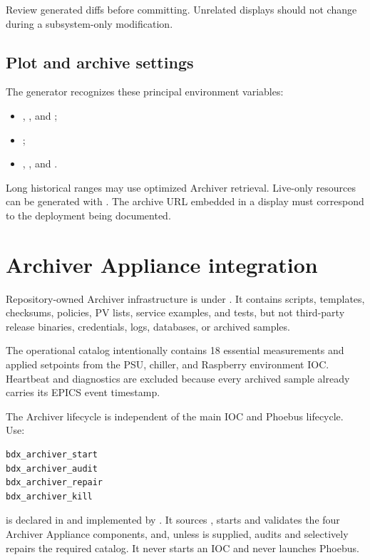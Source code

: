Review generated diffs before committing. Unrelated displays should not change during a subsystem-only modification.

\subsection{Plot and archive settings}

The generator recognizes these principal environment variables:

\begin{itemize}
  \item {}, , and ;
  \item {};
  \item {}, , and .
\end{itemize}

Long historical ranges may use optimized Archiver retrieval. Live-only resources can be generated with . The archive URL embedded in a display must correspond to the deployment being documented.

\section{Archiver Appliance integration}

Repository-owned Archiver infrastructure is under . It contains scripts, templates, checksums, policies, PV lists, service examples, and tests, but not third-party release binaries, credentials, logs, databases, or archived samples.

The operational catalog intentionally contains 18 essential measurements and applied setpoints from the PSU, chiller, and Raspberry environment IOC. Heartbeat and  diagnostics are excluded because every archived sample already carries its EPICS event timestamp.

The Archiver lifecycle is independent of the main IOC and Phoebus lifecycle. Use:

\begin{lstlisting}[style=shell]
bdx_archiver_start
bdx_archiver_audit
bdx_archiver_repair
bdx_archiver_kill
\end{lstlisting}

 is declared in  and implemented by . It sources , starts and validates the four Archiver Appliance components, and, unless  is supplied, audits and selectively repairs the required catalog. It never starts an IOC and never launches Phoebus.

